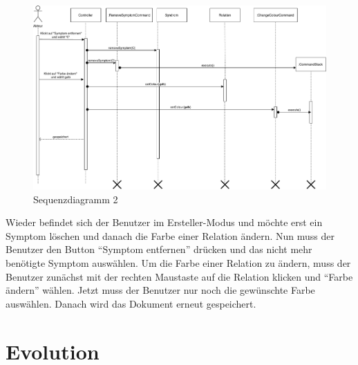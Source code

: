 \documentclass[enabledeprecatedfontcommands,fontsize=12pt,paper=a4,twoside,parskip=half]{scrartcl}
\begin{document}
\begin{figure}[H]
    \centering
    \includegraphics[width=\textwidth]{Bilder/SyndromansatzSWP2.pdf}
    \caption{Sequenzdiagramm 2}
    \label{fig:SyndromansatzSWP2}
\end{figure}
Wieder befindet sich der Benutzer im Ersteller-Modus und möchte erst ein Symptom löschen und danach die Farbe einer Relation ändern. Nun muss der Benutzer den Button \enquote{Symptom entfernen} drücken und das nicht mehr benötigte Symptom auswählen. Um die Farbe einer Relation zu ändern, muss der Benutzer zunächst mit der rechten Maustaste auf die Relation klicken und \enquote{Farbe ändern} wählen. Jetzt muss der Benutzer nur noch die gewünschte Farbe auswählen. Danach wird das Dokument erneut gespeichert.
\newpage



\section{Evolution}

\label{sec:evolution}

\end{document}
